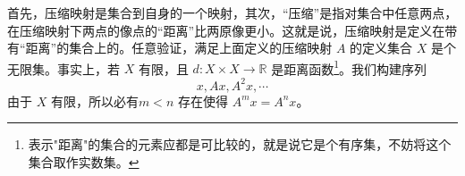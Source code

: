首先，压缩映射是集合到自身的一个映射，其次，“压缩”是指对集合中任意两点，在压缩映射下两点的像点的“距离”比两原像更小。这就是说，压缩映射是定义在带有“距离”的集合上的。任意验证，满足上面定义的压缩映射 $A$ 的定义集合 $X$ 是个无限集。事实上，若 $X$ 有限，且 $d:X\times X\rightarrow \mathbb R$ 是距离函数\footnote{表示"距离"的集合的元素应都是可比较的，就是说它是个有序集，不妨将这个集合取作实数集。}。我们构建序列
\begin{equation}
x,Ax,A^2x,\cdots
\end{equation}
由于 $X$ 有限，所以必有$m<n$ 存在使得 $A^mx=A^nx$。